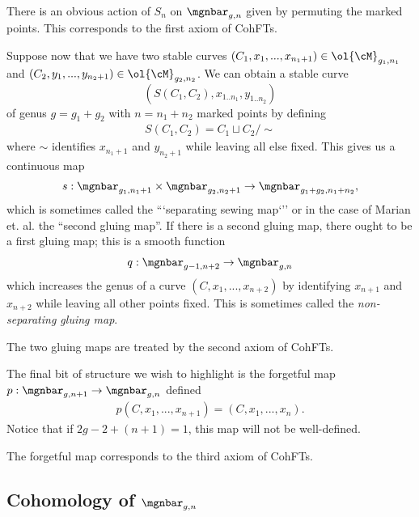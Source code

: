 \documentclass[raggedright, nofonts, notitlepage, openany, debug]{tufte-book}
\begin{document}
\begin{rmk}
  There is an obvious action of $S_n$ on $\mgnbar_{g,n}$ given by permuting the marked points. This corresponds to the first axiom of CohFTs.
\end{rmk}

Suppose now that we have two stable curves $(C_1,x_1,...,x_{n_1+1}) \in \ol{\cM}_{g_1,n_1}$ and $(C_2,y_1,...,y_{n_2+1}) \in \ol{\cM}_{g_2, n_2}$. We can obtain a stable curve $$(S(C_1, C_2),x_{1..n_1}, y_{1..n_2})$$ of genus $g = g_1 + g_2$ with $n = n_1 + n_2$ marked points by defining
\begin{align*}
  S(C_1,C_2) = C_1 \sqcup C_2/\sim
\end{align*}
where $\sim$ identifies $x_{n_1 + 1}$ and $y_{n_2 + 1}$ while leaving all else fixed. This gives us a continuous map
\begin{align*}
  s: \mgnbar_{g_1,n_1 + 1} \times \mgnbar_{g_2,n_2+1} \to \mgnbar_{g_1 + g_2,n_1 + n_2},
\end{align*}
which is sometimes called the ```separating sewing map`'' or in the case of Marian et. al. the ``second gluing map''. If there is a second gluing map, there ought to be a first gluing map; this is a smooth function
\begin{align*}
  q: \mgnbar_{g-1,n+2} \to \mgnbar_{g,n}
\end{align*}
which increases the genus of a curve $(C,x_1,...,x_{n+2})$ by identifying $x_{n+1}$ and $x_{n+2}$ while leaving all other points fixed. This is sometimes called the \emph{non-separating gluing map}.
\begin{rmk}
  The two gluing maps are treated by the second axiom of CohFTs.
\end{rmk}

The final bit of structure we wish to highlight is the forgetful map $p:\mgnbar_{g,n+1} \to \mgnbar_{g,n}$ defined
\begin{align*}
  p(C,x_1,...,x_{n+1}) = (C,x_1,...,x_n).
\end{align*}
Notice that if $2g - 2 + (n+1) = 1$, this map will not be well-defined.

\begin{rmk}
  The forgetful map corresponds to the third axiom of CohFTs.
\end{rmk}

\subsection{Cohomology of $\mgnbar_{g,n}$}
\end{document}
